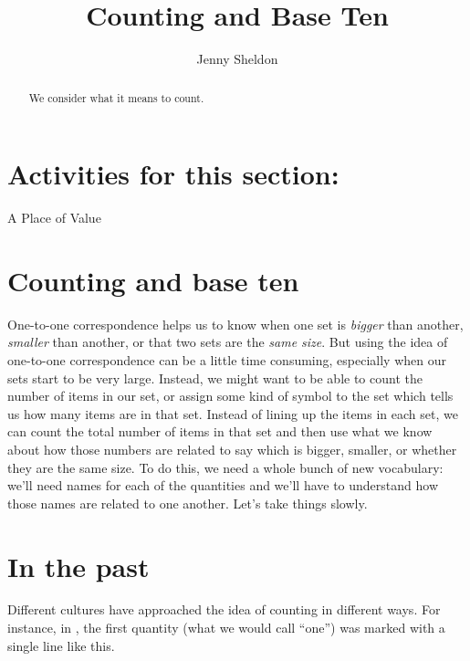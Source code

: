 \documentclass{ximera}
\title{Counting and Base Ten}
\author{Jenny Sheldon}
\begin{document}
\begin{abstract}
We consider what it means to count.
\end{abstract}
\maketitle

\section{Activities for this section:} A Place of Value


\section{Counting and base ten}

One-to-one correspondence helps us to know when one set is {\em bigger} than another, {\em smaller} than another, or that two sets are the {\em same size}. But using the idea of one-to-one correspondence can be a little time consuming, especially when our sets start to be very large. Instead, we might want to be able to count the number of items in our set, or assign some kind of symbol to the set which tells us how many items are in that set. Instead of lining up the items in each set, we can count the total number of items in that set and then use what we know about how those numbers are related to say which is bigger, smaller, or whether they are the same size. To do this, we need a whole bunch of new vocabulary: we'll need names for each of the quantities and we'll have to understand how those names are related to one another. Let's take things slowly.

\section{In the past} 

Different cultures have approached the idea of counting in different ways. For instance, in , the first quantity (what we would call ``one'') was marked with a single line like this.


\begin{center}
\end{center}
\end{document}
